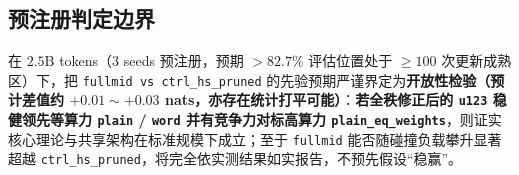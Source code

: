 \documentclass[10.5pt,a4paper]{ctexart}
\begin{document}
\subsection{预注册判定边界}
在 $2.5\text{B}$ tokens（3 seeds 预注册，预期 $>82.7\%$ 评估位置处于 $\ge 100$ 次更新成熟区）下，把 \texttt{fullmid vs ctrl\_hs\_pruned} 的先验预期严谨界定为\textbf{开放性检验（预计差值约 $+0.01 \sim +0.03$ nats，亦存在统计打平可能）}：\textbf{若全秩修正后的 \texttt{u123} 稳健领先等算力 \texttt{plain} / \texttt{word} 并有竞争力对标高算力 \texttt{plain\_eq\_weights}}，则证实核心理论与共享架构在标准规模下成立；至于 \texttt{fullmid} 能否随碰撞负载攀升显著超越 \texttt{ctrl\_hs\_pruned}，将完全依实测结果如实报告，不预先假设“稳赢”。
\end{document}
